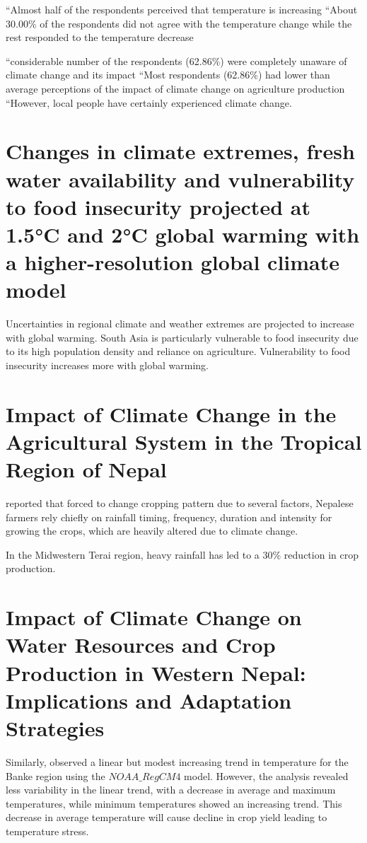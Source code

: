\documentclass[a4paper,12pt]{article}
\begin{document}
\parencite{dawadiImpactClimateChange2022}
“Almost half of the respondents perceived that temperature is increasing “About 30.00\% of the respondents did not agree with the temperature change while the rest responded to the temperature decrease

“considerable number of the respondents (62.86\%) were completely unaware of climate change and its impact “Most respondents (62.86\%) had lower than average perceptions of the impact of climate change on agriculture production “However, local people have certainly experienced climate change.

\section{Changes in climate extremes, fresh water availability and vulnerability to food insecurity projected at 1.5°C and 2°C global warming with a higher-resolution global climate model}
\parencite{bettsChangesClimateExtremes2018}
Uncertainties in regional climate and weather extremes are projected to increase with global warming. South Asia is particularly vulnerable to food insecurity due to its high population density and reliance on agriculture.
Vulnerability to food insecurity increases more with global warming.

\section{Impact of Climate Change in the Agricultural System in the Tropical Region of Nepal}
\parencite{bhattaraiImpactClimateChange2021} reported that forced to change cropping pattern due to several factors, Nepalese farmers rely chiefly on rainfall timing, frequency, duration and intensity for growing the crops, which are heavily altered due to climate change.

In the Midwestern Terai region, heavy rainfall has led to a 30\% reduction in crop production.


\section{Impact of Climate Change on Water Resources and Crop Production in Western Nepal: Implications and Adaptation Strategies}
\parencite{risalImpactClimateChange2022}

Similarly, \parencite{risalImpactClimateChange2022} observed a linear but modest increasing trend in temperature for the Banke region using the $NOAA\_RegCM4$ model. However, the analysis revealed less variability in the linear trend, with a decrease in average and maximum temperatures, while minimum temperatures showed an increasing trend.
This decrease in average temperature will cause decline in crop yield leading to temperature stress.
\end{document}
